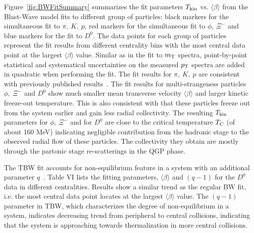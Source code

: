 \documentclass[%
 reprint,	
 amsmath,amssymb,
 aps,
 prc,
]{revtex4-1}
\begin{document}
Figure~\ref{fig:BWFitSummary} summarizes the fit parameters $T_{\rm kin}$ vs. $\langle\beta\rangle$ from the Blast-Wave model fits to different group of particles: black markers for the simultaneous fit to $\pi,\ K,\ p$, red markers for the simultaneous fit to $\phi,\ \Xi^-$ and blue markers for the fit to $D^0$. The data points for each group of particles represent the fit results from different centrality bins with the most central data point at the largest $\langle\beta\rangle$ value. Similar as in the fit to $m_{\rm T}$ spectra, point-by-point statistical and systematical uncertainties on the measured $p_{\rm T}$ spectra are added in quadratic when performing the fit. The fit results for $\pi,\ K,\ p$ are consistent with previously published results~\cite{Tang:2008ud}. The fit results for multi-strangeness particles $\phi,\ \Xi^{-}$ and $D^0$ show much smaller mean transverse velocity $\langle\beta\rangle$ and larger kinetic freeze-out temperature. This is also consistent with that these particles freeze out from the system earlier and gain less radial collectivity. The resulting $T_{\rm kin}$ parameters for $\phi,\ \Xi^-$ and for $D^0$ are close to the critical temperature $T_{\rm C}$ (of about 160 MeV) indicating negligible contribution from the hadronic stage to the observed radial flow of these particles. The collectivity they obtain are mostly through the partonic stage re-scatterings in the QGP phase. 

The TBW fit accounts for non-equilibrium feature in a system with an additional parameter $q$~\cite{Tang:2008ud}. %
Table VI lists the fitting parameters, $\langle\beta\rangle$ and $(q-1)$ for the $D^0$ data in different centralities. Results show a similar trend as the regular BW fit, i.e. the most central data point locates at the largest $\langle\beta\rangle$ value. The $(q-1)$ parameter in TBW, which characterizes the degree of non-equilibrium in a system, indicates decreasing trend from peripheral to central collisions, indicating that the system is approaching towards thermalization in more central collisions.
\end{document}
